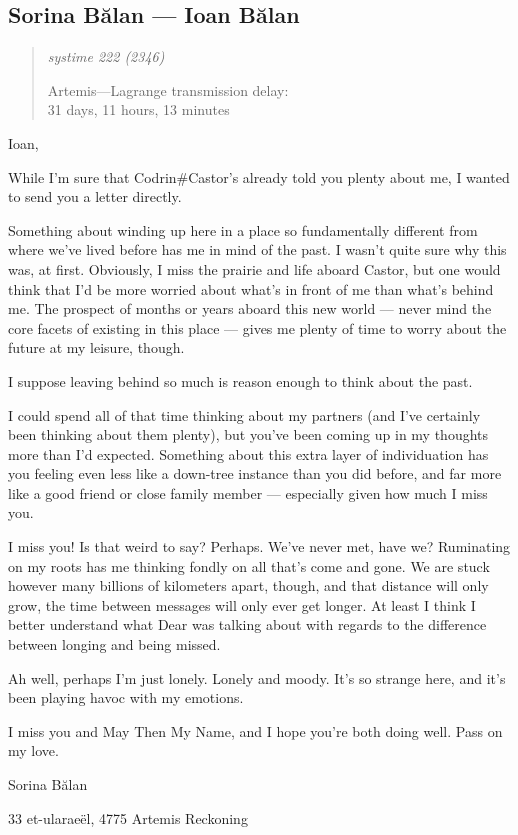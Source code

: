 \hypertarget{sorina-bux103lan-ioan-bux103lan}{%
\subsection{Sorina Bălan — Ioan Bălan}\label{sorina-bux103lan-ioan-bux103lan}}

\begin{quote}
\itshape
systime 222 (2346)

Artemis---Lagrange transmission delay:\\
31 days, 11 hours, 13 minutes
\end{quote}

Ioan,

While I'm sure that Codrin\#Castor's already told you plenty about me, I wanted to send you a letter directly.

Something about winding up here in a place so fundamentally different from where we've lived before has me in mind of the past. I wasn't quite sure why this was, at first. Obviously, I miss the prairie and life aboard Castor, but one would think that I'd be more worried about what's in front of me than what's behind me. The prospect of months or years aboard this new world — never mind the core facets of existing in this place — gives me plenty of time to worry about the future at my leisure, though.

I suppose leaving behind so much is reason enough to think about the past.

I could spend all of that time thinking about my partners (and I've certainly been thinking about them plenty), but you've been coming up in my thoughts more than I'd expected. Something about this extra layer of individuation has you feeling even less like a down-tree instance than you did before, and far more like a good friend or close family member — especially given how much I miss you.

I miss you! Is that weird to say? Perhaps. We've never met, have we? Ruminating on my roots has me thinking fondly on all that's come and gone. We are stuck however many billions of kilometers apart, though, and that distance will only grow, the time between messages will only ever get longer. At least I think I better understand what Dear was talking about with regards to the difference between longing and being missed.

Ah well, perhaps I'm just lonely. Lonely and moody. It's so strange here, and it's been playing havoc with my emotions.

I miss you and May Then My Name, and I hope you're both doing well. Pass on my love.

Sorina Bălan

33 et-ularaeël, 4775 Artemis Reckoning
